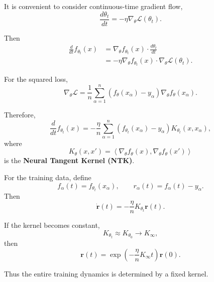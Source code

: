 It is convenient to consider continuous-time gradient flow,
\begin{equation}
    \frac{d\theta_t}{dt}
    =
    -\eta
    \nabla_\theta
    \mathcal{L}(\theta_t).
\end{equation}

Then
\begin{align}
    \frac{d}{dt}
    f_{\theta_t}(x)
    &=
    \nabla_\theta f_{\theta_t}(x)
    \cdot
    \frac{d\theta_t}{dt}
    \\
    &=
    -\eta
    \nabla_\theta f_{\theta_t}(x)
    \cdot
    \nabla_\theta
    \mathcal{L}(\theta_t).
\end{align}

For the squared loss,
\begin{equation}
    \nabla_\theta\mathcal{L}
    =
    \frac{1}{n}
    \sum_{\alpha=1}^{n}
    \left(
        f_{\theta}(x_\alpha)-y_\alpha
    \right)
    \nabla_\theta f_\theta(x_\alpha).
\end{equation}

Therefore,
\begin{equation}
    \boxed{
    \frac{d}{dt}
    f_{\theta_t}(x)
    =
    -
    \frac{\eta}{n}
    \sum_{\alpha=1}^{n}
    \left(
        f_{\theta_t}(x_\alpha)-y_\alpha
    \right)
    K_{\theta_t}(x,x_\alpha),
    }
\end{equation}
where
\begin{equation}
    \boxed{
    K_\theta(x,x')
    =
    \left\langle
        \nabla_\theta f_\theta(x),
        \nabla_\theta f_\theta(x')
    \right\rangle
    }
\end{equation}
is the \textbf{Neural Tangent Kernel (NTK)}.

For the training data, define
\[
f_\alpha(t)=f_{\theta_t}(x_\alpha),
\qquad
r_\alpha(t)=f_\alpha(t)-y_\alpha.
\]
Then
\begin{equation}
    \boxed{
    \dot{\mathbf r}(t)
    =
    -
    \frac{\eta}{n}
    K_{\theta_t}
    \mathbf r(t).
    }
\end{equation}

If the kernel becomes constant,
\[
K_{\theta_t}
\approx
K_{\theta_0}
\rightarrow
K_\infty,
\]
then
\begin{equation}
    \boxed{
    \mathbf r(t)
    =
    \exp\!\left(
        -\frac{\eta}{n}K_\infty t
    \right)
    \mathbf r(0).
    }
\end{equation}

Thus the entire training dynamics is determined by a fixed kernel.

